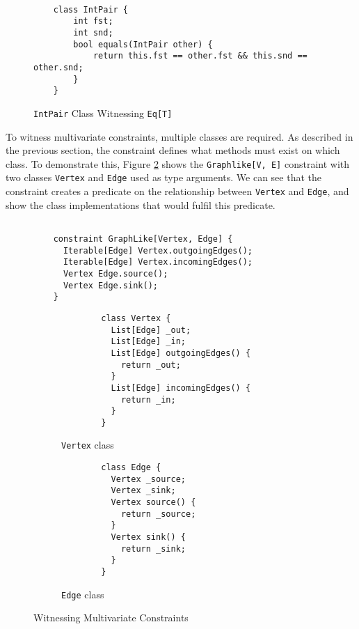 \begin{figure}[h]
    \centering
    \begin{verbatim}
    
    class IntPair {
        int fst;
        int snd;
        bool equals(IntPair other) {
            return this.fst == other.fst && this.snd == other.snd;
        }
    }
    \end{verbatim}
    \caption{\texttt{IntPair} Class Witnessing \texttt{Eq[T]}}
    \label{fig:eq-class}
\end{figure}

To witness multivariate constraints, multiple classes are required. As described in the previous section, the constraint defines what methods must exist on which class. To demonstrate this, Figure \ref{fig:graph-class} shows the \texttt{Graphlike[V, E]} constraint with two classes \texttt{Vertex} and \texttt{Edge} used as type arguments. We can see that the constraint creates a predicate on the relationship between \texttt{Vertex} and \texttt{Edge}, and show the class implementations that would fulfil this predicate. \\

\begin{figure}[h]
    \centering
    \begin{verbatim}
    
    constraint GraphLike[Vertex, Edge] {
      Iterable[Edge] Vertex.outgoingEdges();
      Iterable[Edge] Vertex.incomingEdges();
      Vertex Edge.source();
      Vertex Edge.sink();
    }
    \end{verbatim}
    \begin{subfigure}[t]{0.45\textwidth}
        \begin{verbatim}
        class Vertex {
          List[Edge] _out;
          List[Edge] _in;
          List[Edge] outgoingEdges() {
            return _out;
          }
          List[Edge] incomingEdges() {
            return _in;
          }
        }
        \end{verbatim}
        \caption{\texttt{Vertex} class}
    \end{subfigure}
    \hfill
    \begin{subfigure}[t]{0.45\textwidth}
        \begin{verbatim}
        class Edge {
          Vertex _source;
          Vertex _sink;
          Vertex source() {
            return _source;
          }
          Vertex sink() {
            return _sink;
          }
        }
        \end{verbatim}
        \caption{\texttt{Edge} class}
    \end{subfigure}
    \caption{Witnessing Multivariate Constraints}
    \label{fig:graph-class}
\end{figure}

